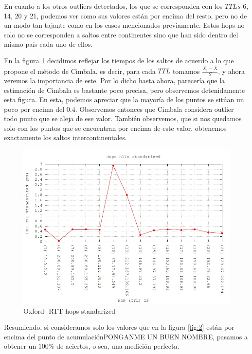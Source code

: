 En cuanto a los otros outliers detectados, los que se corresponden con los $TTLs$ 6, 14, 20 y 21, podemos ver como sus valores están por encima del resto, pero no de un modo tan tajante como en los casos mencionados previamente. Estos hops no solo no se corresponden a saltos entre continentes sino que han sido dentro del mismo país cada uno de ellos.


En la figura \ref{tiempos-oxford-estandarizados} decidimos reflejar los tiempos de los saltos de acuerdo a lo que propone el método de Cimbala, es decir, para cada $TTL$ tomamos $\frac{X_i - \bar{X}}{S}$, y ahora veremos la importancia de este. Por lo dicho hasta ahora, parecería que la estimación de Cimbala es bastante poco precisa, pero observemos detenidamente esta figura. En esta, podemos apreciar que la mayoría de los puntos se sitúan un poco por encima del 0.4. Observemos entonces que Cimbala considera outlier todo  punto que se aleja de ese valor. También observemos, que si nos quedamos solo con los puntos que se encuentran por encima de este valor, obtenemos exactamente los saltos intercontinentales.


\begin{figure}[!htbp]
  \centering
    \includegraphics[scale=0.5]{imagenes/oxford-graficos/traceroute-oxford-standarized.jpg}
  \caption{Oxford- RTT hops standarized}
  \label{tiempos-oxford-estandarizados}
\end{figure}

Resumiendo, si consideramos solo los valores que en la figura \ref{fig:2} están por encima del punto de acumulaciónPONGANME UN BUEN NOMBRE, pasamos a obtener un $100\%$ de aciertos, o sea, una medición perfecta.


